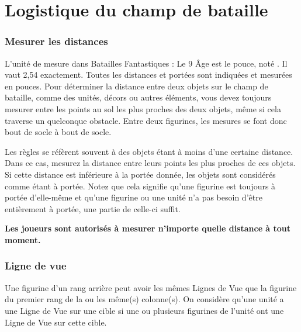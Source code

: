 
\part{Logistique du champ de bataille}

\section{Mesurer les distances}

L'unité de mesure dans Batailles Fantastiques : Le 9\ieme{} Âge est le pouce, noté \distance{}. Il vaut 2,54 {\centi\meter} exactement. Toutes les distances et portées sont indiquées et mesurées en pouces. Pour déterminer la distance entre deux objets sur le champ de bataille, comme des unités, décors ou autres éléments, vous devez toujours mesurer entre les points au sol les plus proches des deux objets, même si cela traverse un quelconque obstacle. Entre deux figurines, les mesures se font donc bout de socle à bout de socle.

Les règles se réfèrent souvent à des objets étant à moins d'une certaine distance. Dans ce cas, mesurez la distance entre leurs points les plus proches de ces objets. Si cette distance est inférieure à la portée donnée, les objets sont considérés comme étant à portée. Notez que cela signifie qu'une figurine est toujours à portée d'elle-même et qu'une figurine ou une unité n'a pas besoin d'être entièrement à portée, une partie de celle-ci suffit.
 
\textbf{Les joueurs sont autorisés à mesurer n'importe quelle distance à tout moment.}

\section{Ligne de vue}

 Une figurine d'un rang arrière peut avoir les mêmes Lignes de Vue que la figurine du premier rang de la ou les même(s) colonne(s). On considère qu'une unité a une Ligne de Vue sur une cible si une ou plusieurs figurines de l'unité ont une Ligne de Vue sur cette cible. 

